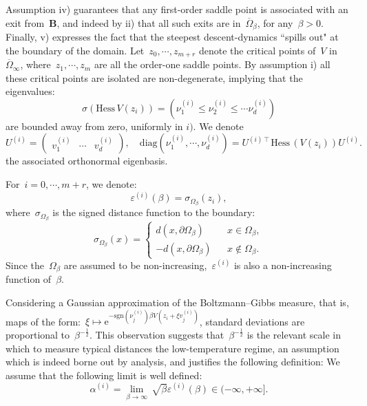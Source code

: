 \documentclass[10pt]{article}
\newcommand{\e}{\mathrm{e}}
\newcommand{\Hess}{\mathrm{Hess}\,}
\newcommand{\1}{\mathbbm 1}
\newcommand{\epsBoundary}[1]{\varepsilon^{(#1)}} %
\newcommand{\epsLimit}[1]{\alpha^{(#1)}} %
\newcommand{\hessPassage}[2][]{U^{(#2)#1}} %
\newcommand{\hessEigvec}[2]{v^{(#1)}_{#2}} %
\newcommand{\hessEigval}[2]{\nu^{(#1)}_{#2}} %
\newcommand{\varepsiloni}{\varepsilon^{(i)}}
\begin{document}
    Assumption iv) guarantees that any first-order saddle point is associated with an exit from~$\mathbf B$, and indeed by ii) that all such exits are in~$\overline\Omega_\beta$, for any~$\beta>0$.
    Finally, v) expresses the fact that the steepest descent-dynamics ``spills out" at the boundary of the domain.
    Let~$z_0,\dotsm,z_{m+r}$ denote the critical points of~$V$ in~$\overline{\Omega}_\infty$, where~$z_1,\dotsm,z_m$ are all the order-one saddle points. 
    By assumption i) all these critical points are isolated are non-degenerate, implying that the eigenvalues:
    \begin{equation}
        \label{eq:eigvals_hessian}
        \sigma(\Hess V(z_i)) = \left(\hessEigval{i}{1} \leq \hessEigval{i}{2} \leq \dotsm \hessEigval{i}{d}\right)
    \end{equation}
    are bounded away from zero, uniformly in $i)$. We denote
    \begin{equation}
        \label{eq:eigvecs_hessian}
        \hessPassage{i} =\begin{pmatrix}\hessEigvec{i}{1}&\dotsm&\hessEigvec{i}{d}\end{pmatrix},\quad \mathrm{diag}(\hessEigval{i}{1},\dotsm,\hessEigval{i}{d}) = \hessPassage[\intercal]{i} \Hess(V(z_i)) \hessPassage{i}.
    \end{equation}
    the associated orthonormal eigenbasis.

    For~$i=0,\dotsm,m+r$, we denote:
    \begin{equation}
        \label{eq:varepsilon}
        \epsBoundary{i}(\beta) = \sigma_{\Omega_\beta}\left(z_i\right),
    \end{equation}
    where~$\sigma_{\Omega_\beta}$ is the signed distance function to the boundary:
    \begin{equation}
        \sigma_{\Omega_\beta}(x) = \left\{\begin{aligned}
            d(x,\partial\Omega_\beta)&&x\in\Omega_\beta,\\
            -d(x,\partial\Omega_\beta)&&x\not\in\Omega_\beta.
        \end{aligned}\right.
    \end{equation}
    Since the~$\Omega_\beta$ are assumed to be non-increasing,~$\varepsiloni$ is also a non-increasing function of~$\beta$.

    Considering a Gaussian approximation of the Boltzmann--Gibbs measure, that is, maps of the form:~$\xi \mapsto \e^{-\mathrm{sgn}(\hessEigval{i}{j})\beta V(z_i+\xi\hessEigvec{i}{j})}$, standard deviations are proportional to~$\beta^{-\frac 12}$. 
    This observation suggests that~$\beta^{-\frac12}$ is the relevant scale in which to measure typical distances the low-temperature regime, an assumption which is indeed borne out by analysis, and justifies the following definition:
    We assume that the following limit is well defined:
    \begin{equation}
        \label{eq:epsLimit_definition}
        \tag{\bf H0}
        \epsLimit{i} =\underset{\beta\to\infty}{\lim}\, \sqrt\beta\epsBoundary{i}(\beta) \in (-\infty,+\infty].
    \end{equation}
\end{document}
